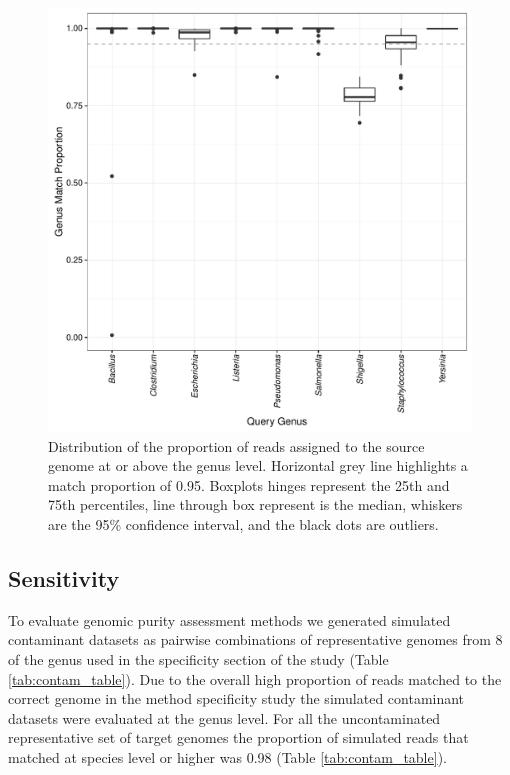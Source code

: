 \documentclass[fleqn,10pt,lineno]{wlpeerj}\usepackage[]{graphicx}\usepackage[]{color}
\makeatletter
\def\maxwidth{ %
  \ifdim\Gin@nat@width>\linewidth
    \linewidth
  \else
    \Gin@nat@width
  \fi
}
\newenvironment{knitrout}{}{} %
\makeatother
\begin{document}
\begin{knitrout}
\color{fgcolor}\begin{figure}
\includegraphics[width=\maxwidth]{figure/single_genus-1} \caption[Distribution of the proportion of reads assigned to the source genome at or above the genus level]{Distribution of the proportion of reads assigned to the source genome at or above the genus level. Horizontal grey line highlights a match proportion of 0.95. Boxplots hinges represent the 25th and 75th percentiles, line through box represent is the median, whiskers are the 95\% confidence interval, and the black dots are outliers.}\label{fig:single_genus}
\end{figure}


\end{knitrout}

\subsection*{Sensitivity}
To evaluate genomic purity assessment methods we generated simulated contaminant datasets as pairwise combinations of representative genomes from 8 of the genus used in the specificity section of the study (Table \ref{tab:contam_table}). Due to the overall high proportion of reads matched to the correct genome in the method specificity study the simulated contaminant datasets were evaluated at the genus level. For all the uncontaminated representative set of target genomes the proportion of simulated reads that matched at species level or higher was 0.98 (Table \ref{tab:contam_table}).
\end{document}

